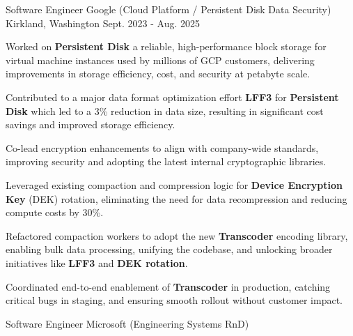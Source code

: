 

\begin{cventries}
\cventry
{Software Engineer} %
{Google (Cloud Platform / Persistent Disk Data Security)} %
{Kirkland, Washington} %
{Sept. 2023 - Aug. 2025} %
{
  \begin{cvitems} %
    \item {
        Worked on \textbf{Persistent Disk} a reliable, high-performance block storage for virtual machine instances used by millions of GCP customers, delivering improvements in storage efficiency, cost, and security at petabyte scale.
    }
    \item {
        Contributed to a major data format optimization effort \textbf{LFF3} for \textbf{Persistent Disk} which led to a 3\% reduction in data size, resulting in significant cost savings and improved storage efficiency.
    }
    \item {
        Co-lead encryption enhancements to align with company-wide standards, improving security and adopting the latest internal cryptographic libraries.
    }
    \item {
        Leveraged existing compaction and compression logic for \textbf{Device Encryption Key} (DEK) rotation, eliminating the need for data recompression and reducing compute costs by 30\%.
    }
    \item {
        Refactored compaction workers to adopt the new \textbf{Transcoder} encoding library, enabling bulk data processing, unifying the codebase, and unlocking broader initiatives like \textbf{LFF3} and \textbf{DEK rotation}.
    }
    \item {
        Coordinated end-to-end enablement of \textbf{Transcoder} in production, catching critical bugs in staging, and ensuring smooth rollout without customer impact.
    }
  \end{cvitems}
}
  \cventry
    {Software Engineer} %
    {Microsoft (Engineering Systems RnD)} %

\end{cventries}
